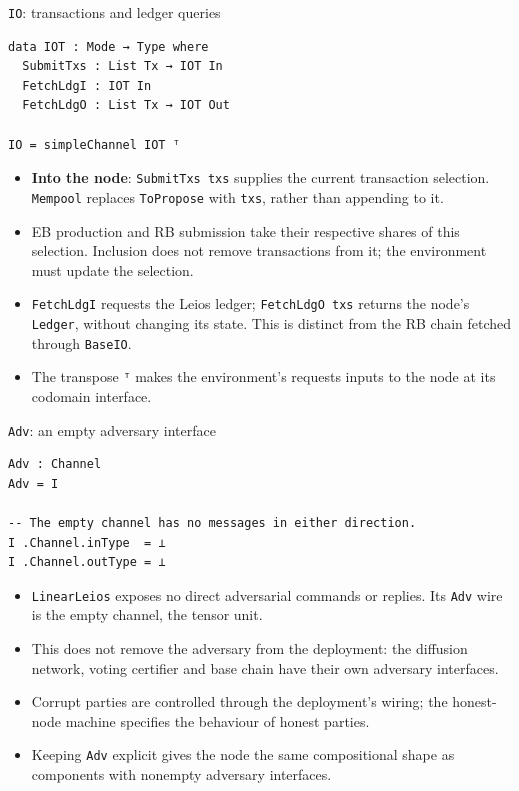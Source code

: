 \documentclass[aspectratio=169,10pt]{beamer}
\newcommand{\agda}[1]{\texttt{#1}}
\begin{document}
\begin{frame}[fragile]{\agda{IO}: transactions and ledger queries}
\begin{verbatim}
data IOT : Mode → Type where
  SubmitTxs : List Tx → IOT In
  FetchLdgI : IOT In
  FetchLdgO : List Tx → IOT Out

IO = simpleChannel IOT ᵀ
\end{verbatim}
  \begin{itemize}
    \item \textbf{Into the node}: \agda{SubmitTxs txs} supplies the current
          transaction selection.  \agda{Mempool} replaces \agda{ToPropose}
          with \agda{txs}, rather than appending to it.
    \item EB production and RB submission take their respective shares of
          this selection.  Inclusion does not remove transactions from it;
          the environment must update the selection.
    \item \agda{FetchLdgI} requests the Leios ledger;
          \agda{FetchLdgO txs} returns the node's \agda{Ledger}, without
          changing its state.  This is distinct from the RB chain fetched
          through \agda{BaseIO}.
    \item The transpose \agda{ᵀ} makes the environment's requests inputs
          to the node at its codomain interface.
  \end{itemize}
\end{frame}

\begin{frame}[fragile]{\agda{Adv}: an empty adversary interface}
\begin{verbatim}
Adv : Channel
Adv = I

-- The empty channel has no messages in either direction.
I .Channel.inType  = ⊥
I .Channel.outType = ⊥
\end{verbatim}
  \begin{itemize}
    \item \agda{LinearLeios} exposes no direct adversarial commands or
          replies.  Its \agda{Adv} wire is the empty channel, the tensor unit.
    \item This does not remove the adversary from the deployment: the
          diffusion network, voting certifier and base chain have their own
          adversary interfaces.
    \item Corrupt parties are controlled through the deployment's wiring;
          the honest-node machine specifies the behaviour of honest parties.
    \item Keeping \agda{Adv} explicit gives the node the same compositional
          shape as components with nonempty adversary interfaces.
  \end{itemize}
\end{frame}
\end{document}
